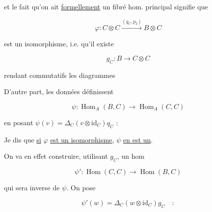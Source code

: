 et le fait qu'on ait \uline{formellement} un fibré hom. principal signifie que

\[
\varphi:C\otimes C\xrightarrow{(q_C,p_2)}B\otimes C
\]

est un isomorphisme, i.e. qu'il existe

\[
g_C:B\longrightarrow C\otimes C
\]


rendant commutatifs les diagrammes




D'autre part, les données \unsure{$(*)$|$*)$} définissent

\[
\psi:\operatorname{Hom}_A(B,C)\longrightarrow\operatorname{Hom}_A(C,C)
\]

en posant $\psi(v)=\Delta_C(v\otimes\mathrm{id}_C)q_C$ :


Je dis que \uline{si} $\varphi$ \uline{est un isomorphisme}, $\psi$ \uline{en est un}.

On va en effet construire, utilisant $g_C$, un hom

\[
\psi':\operatorname{Hom}(C,C)\longrightarrow\operatorname{Hom}(B,C)
\]

qui sera inverse de $\psi$. On pose

\[
\psi'(w)=\Delta_C(w\otimes\mathrm{id}_C)g_C\quad :
\]


